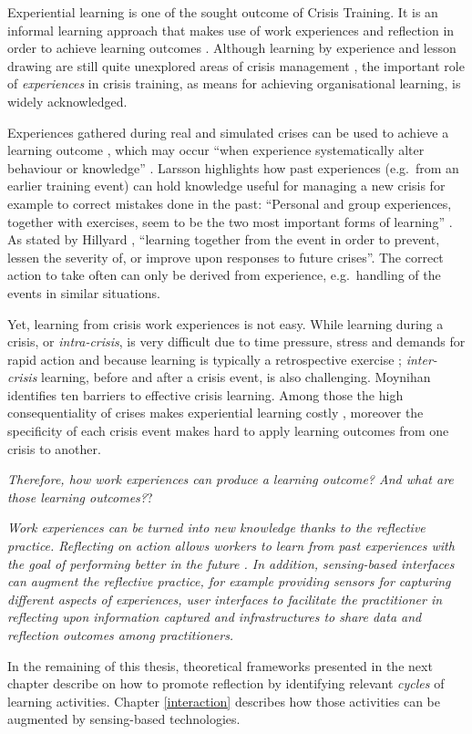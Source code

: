 Experiential learning is one of the sought outcome of Crisis Training. It is an informal learning approach that makes use of work experiences and reflection in order to achieve learning outcomes \autocite{kolb1984organizational}. Although learning by experience and lesson drawing are still quite unexplored areas of crisis management \autocites{Lagadec:1997js}{Boin:2007wt}{Stern:1997eb}, the important role of \emph{experiences} in crisis training, as means for achieving organisational learning, is widely acknowledged.

Experiences gathered during real and simulated crises can be used to achieve a learning outcome \autocite{Deverell:2009fk}, which may occur ``when experience systematically alter behaviour or knowledge'' \autocite[p.233]{Schwab:2007iw}. Larsson \autocite{Larsson:2010jr} highlights how past experiences (e.g.~from an earlier training event) can hold knowledge useful for managing a new crisis for example to correct mistakes done in the past: ``Personal and group experiences, together with exercises, seem to be the two most important forms of learning'' \autocite[p.714]{Larsson:2010jr}. As stated by Hillyard \autocite*{Hillyard:SYlJRQLN}, ``learning together from the event in order to prevent, lessen the severity of, or improve upon responses to future crises''. The correct action to take often can only be derived from experience, e.g.~handling of the events in similar situations.

Yet, learning from crisis work experiences is not easy. While learning during a crisis, or \emph{intra-crisis}, is very difficult due to time pressure, stress and demands for rapid action \autocite{Deverell:2009fk} and because learning is typically a retrospective exercise \autocite{jasanoff1994learning}; \emph{inter-crisis} learning, before and after a crisis event, is also challenging. Moynihan \autocite*{Moynihan:2008gq} identifies ten barriers to effective crisis learning. Among those the high consequentiality of crises makes experiential learning costly \autocite{LaPorte:1991gk}, moreover the specificity of each crisis event makes hard to apply learning outcomes from one crisis to another.

\emph{Therefore, how work experiences can produce a learning outcome? And what are those learning outcomes?}?

\emph{Work experiences can be turned into new knowledge thanks to the reflective practice. Reflecting on action allows workers to learn from past experiences with the goal of performing better in the future \autocites{boud1985reflection}{Schon:1983ut}. In addition, sensing-based interfaces can augment the reflective practice, for example providing sensors for capturing different aspects of experiences, user interfaces to facilitate the practitioner in reflecting upon information captured and infrastructures to share data and reflection outcomes among practitioners.}

In the remaining of this thesis, theoretical frameworks presented in the next chapter describe on how to promote reflection by identifying relevant \emph{cycles} of learning activities. Chapter \ref{interaction} describes how those activities can be augmented by sensing-based technologies. 

